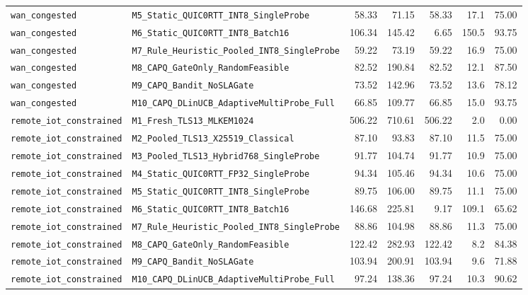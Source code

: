 \begin{table}[t]
{\begin{tabular}{@{}llrrrrr@{}}
\texttt{wan\_congested} & \texttt{M5\_Static\_QUIC0RTT\_INT8\_SingleProbe} & 58.33 & 71.15 & 58.33 & 17.1 & 75.00 \\
\texttt{wan\_congested} & \texttt{M6\_Static\_QUIC0RTT\_INT8\_Batch16} & 106.34 & 145.42 & 6.65 & 150.5 & 93.75 \\
\texttt{wan\_congested} & \texttt{M7\_Rule\_Heuristic\_Pooled\_INT8\_SingleProbe} & 59.22 & 73.19 & 59.22 & 16.9 & 75.00 \\
\texttt{wan\_congested} & \texttt{M8\_CAPQ\_GateOnly\_RandomFeasible} & 82.52 & 190.84 & 82.52 & 12.1 & 87.50 \\
\texttt{wan\_congested} & \texttt{M9\_CAPQ\_Bandit\_NoSLAGate} & 73.52 & 142.96 & 73.52 & 13.6 & 78.12 \\
\texttt{wan\_congested} & \texttt{M10\_CAPQ\_DLinUCB\_AdaptiveMultiProbe\_Full} & 66.85 & 109.77 & 66.85 & 15.0 & 93.75 \\
\texttt{remote\_iot\_constrained} & \texttt{M1\_Fresh\_TLS13\_MLKEM1024} & 506.22 & 710.61 & 506.22 & 2.0 & 0.00 \\
\texttt{remote\_iot\_constrained} & \texttt{M2\_Pooled\_TLS13\_X25519\_Classical} & 87.10 & 93.83 & 87.10 & 11.5 & 75.00 \\
\texttt{remote\_iot\_constrained} & \texttt{M3\_Pooled\_TLS13\_Hybrid768\_SingleProbe} & 91.77 & 104.74 & 91.77 & 10.9 & 75.00 \\
\texttt{remote\_iot\_constrained} & \texttt{M4\_Static\_QUIC0RTT\_FP32\_SingleProbe} & 94.34 & 105.46 & 94.34 & 10.6 & 75.00 \\
\texttt{remote\_iot\_constrained} & \texttt{M5\_Static\_QUIC0RTT\_INT8\_SingleProbe} & 89.75 & 106.00 & 89.75 & 11.1 & 75.00 \\
\texttt{remote\_iot\_constrained} & \texttt{M6\_Static\_QUIC0RTT\_INT8\_Batch16} & 146.68 & 225.81 & 9.17 & 109.1 & 65.62 \\
\texttt{remote\_iot\_constrained} & \texttt{M7\_Rule\_Heuristic\_Pooled\_INT8\_SingleProbe} & 88.86 & 104.98 & 88.86 & 11.3 & 75.00 \\
\texttt{remote\_iot\_constrained} & \texttt{M8\_CAPQ\_GateOnly\_RandomFeasible} & 122.42 & 282.93 & 122.42 & 8.2 & 84.38 \\
\texttt{remote\_iot\_constrained} & \texttt{M9\_CAPQ\_Bandit\_NoSLAGate} & 103.94 & 200.91 & 103.94 & 9.6 & 71.88 \\
\texttt{remote\_iot\_constrained} & \texttt{M10\_CAPQ\_DLinUCB\_AdaptiveMultiProbe\_Full} & 97.24 & 138.36 & 97.24 & 10.3 & 90.62 \\
\bottomrule
\end{tabular}%
}
\end{table}
